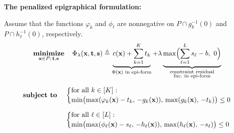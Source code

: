 \documentclass[aspectratio=169,xcolor=dvipsnames]{beamer}
\begin{document}



\begin{frame}
  \footnotesize
  \setlength{\abovedisplayskip}{4pt}
  \setlength{\belowdisplayskip}{4pt}

  \textbf{The penalized epigraphical formulation:}

  \vspace{0.04cm}
  {\color{MediumBlue}Assume that the functions $\varphi_k$ and
  $\phi_\ell$ are nonnegative on $P\cap g_k^{-1}(0)$ and
  $P\cap h_\ell^{-1}(0)$, respectively.}
  \[
    \operatorname*{\textbf{minimize}}_{\mathbf{x}\in P;\,\mathbf{t},\mathbf{s}}
    \quad
    \Phi_\lambda(\mathbf{x},\mathbf{t},\mathbf{s})\triangleq
    \underbrace{c(\mathbf{x})+\sum_{k=1}^{K}t_k}_{\Phi(\mathbf{x})\text{ in epi-form}}
    +\lambda\underbrace{\max\Bigl(\sum_{\ell=1}^{L}s_\ell-b,\ 0\Bigr)}_{
      \substack{\text{constraint residual}\\\text{fnc.\ in epi-form}}}
  \]

  \[
    \operatorname*{\textbf{subject to}}\quad
    \begin{aligned}[t]
      &\left\{\begin{array}{@{}l@{}}
        \text{for all }k\in[K]:\\[2pt]
        \min\bigl(\max(\varphi_k(\mathbf{x})-t_k,\,-g_k(\mathbf{x})),\,
          \max(g_k(\mathbf{x}),\,-t_k)\bigr)\leq 0
      \end{array}\right.\\[6pt]
      &\left\{\begin{array}{@{}l@{}}
        \text{for all }\ell\in[L]:\\[2pt]
        \min\bigl(\max(\phi_\ell(\mathbf{x})-s_\ell,\,-h_\ell(\mathbf{x})),\,
          \max(h_\ell(\mathbf{x}),\,-s_\ell)\bigr)\leq 0
      \end{array}\right.
    \end{aligned}
  \]
\end{frame}
\end{document}
